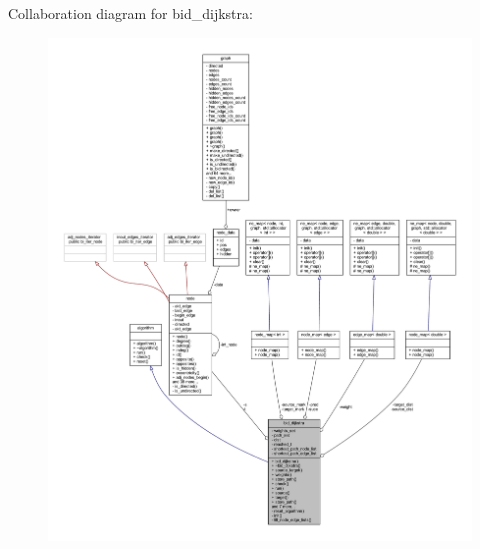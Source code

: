 Collaboration diagram for bid\+\_\+dijkstra\+:\nopagebreak
\begin{figure}[H]
\begin{center}
\leavevmode
\includegraphics[width=350pt]{classbid__dijkstra__coll__graph}
\end{center}
\end{figure}

